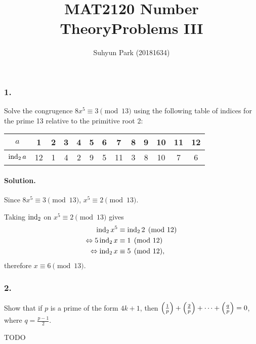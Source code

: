 



\title{MAT2120 Number Theory\newline\space Problems III}
\author{Suhyun Park (20181634)}

\maketitle

\subsubsection{1.} Solve the congrugence $8x^5 \equiv 3 \pmod{13}$ using the following
table of indices for the prime 13 relative to the primitive root 2:
\begin{center}
    \begin{tabular}{|c||c|c|c|c|c|c|c|c|c|c|c|c|}
        \hline
        $a$ & 1 & 2 & 3 & 4 & 5 & 6 & 7 & 8 & 9 & 10 & 11 & 12 \\
        \hline
        $\operatorname{\mathrm{ind}}_2 a$ & 12 & 1 & 4 & 2 & 9 & 5 & 11 & 3 & 8 & 10 & 7 & 6 \\
        \hline
    \end{tabular}
\end{center}

\paragraph{Solution.}
Since $8x^5 \equiv 3 \pmod{13}$, $x^5 \equiv 2 \pmod{13}$.

Taking $\operatorname{\mathrm{ind}}_2$ on $x^5 \equiv 2 \pmod{13}$ gives
\begin{align*}
    \operatorname{\mathrm{ind}}_2 x^5 &\equiv \operatorname{\mathrm{ind}}_2 2 \pmod{12} \\
    \Leftrightarrow 5 \operatorname{\mathrm{ind}}_2 x &\equiv 1 \pmod{12} \\
    \Leftrightarrow \operatorname{\mathrm{ind}}_2 x &\equiv 5 \pmod{12},
\end{align*}
therefore $x \equiv 6 \pmod{13}$.

\subsubsection{2.} Show that if $p$ is a prime of the form $4k+1$, then
$\left(\frac{1}{p}\right) + \left(\frac{2}{p}\right) + \cdots + \left(\frac{q}{p}\right)=0$, where
$q=\frac{p-1}{2}$.

{\Large TODO}

